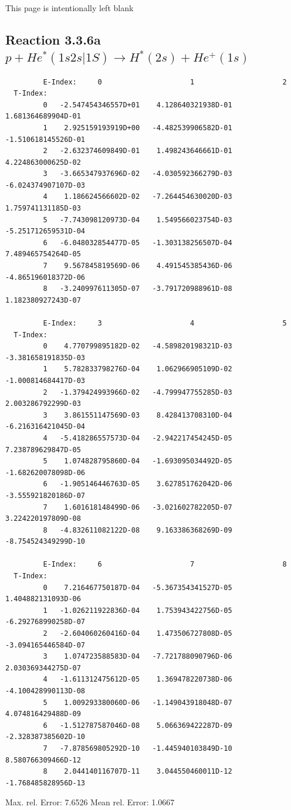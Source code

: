 \documentclass[12pt,dvips]{article}
\begin{document}
\newpage
This page is intentionally left blank
\newpage
\subsection{
Reaction 3.3.6a  $ p + He^*(1s2s|1S) \rightarrow H^*(2s) + He^+(1s) $
}


\begin{small}\begin{verbatim}
         E-Index:     0                     1                     2
  T-Index:
         0   -2.547454346557D+01    4.128640321938D-01    1.681364689904D-01
         1    2.925159193919D+00   -4.482539906582D-01   -1.510618145526D-01
         2   -2.632374609849D-01    1.498243646661D-01    4.224863000625D-02
         3   -3.665347937696D-02   -4.030592366279D-03   -6.024374907107D-03
         4    1.186624566602D-02   -7.264454630020D-03    1.759741131185D-03
         5   -7.743098120973D-04    1.549566023754D-03   -5.251712659531D-04
         6   -6.048032854477D-05   -1.303138256507D-04    7.489465754264D-05
         7    9.567845819569D-06    4.491545385436D-06   -4.865196018372D-06
         8   -3.240997611305D-07   -3.791720988961D-08    1.182380927243D-07

         E-Index:     3                     4                     5
  T-Index:
         0    4.770799895182D-02   -4.589820198321D-03   -3.381658191835D-03
         1    5.782833798276D-04    1.062966905109D-02   -1.000814684417D-03
         2   -1.379424993966D-02   -4.799947755285D-03    2.003286792299D-03
         3    3.861551147569D-03    8.428413708310D-04   -6.216316421045D-04
         4   -5.418286557573D-04   -2.942217454245D-05    7.238789629847D-05
         5    1.074828795860D-04   -1.693095034492D-05   -1.682620078098D-06
         6   -1.905146446763D-05    3.627851762042D-06   -3.555921820186D-07
         7    1.601618148499D-06   -3.021602782205D-07    3.224220197809D-08
         8   -4.832611082122D-08    9.163386368269D-09   -8.754524349299D-10

         E-Index:     6                     7                     8
  T-Index:
         0    7.216467750187D-04   -5.367354341527D-05    1.404882131093D-06
         1   -1.026211922836D-04    1.753943422756D-05   -6.292768990258D-07
         2   -2.604060260416D-04    1.473506727808D-05   -3.094165446584D-07
         3    1.074723588583D-04   -7.721788090796D-06    2.030369344275D-07
         4   -1.611312475612D-05    1.369478220738D-06   -4.100428990113D-08
         5    1.009293380060D-06   -1.149043918048D-07    4.074816429488D-09
         6   -1.512787587046D-08    5.066369422287D-09   -2.328387385602D-10
         7   -7.878569805292D-10   -1.445940103849D-10    8.580766309466D-12
         8    2.044140116707D-11    3.044550460011D-12   -1.768485828956D-13

\end{verbatim}\end{small}
  Max. rel. Error:   7.6526 %
  Mean rel. Error:   1.0667 %
\end{document}
